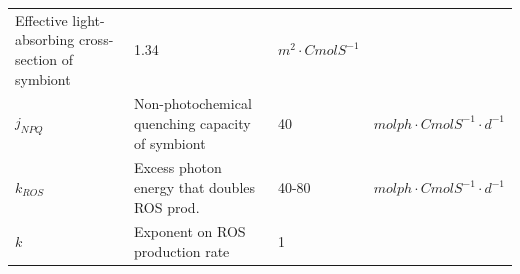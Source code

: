 \documentclass[]{elsarticle} %
\begin{document}
\begin{longtable}[c]{@{}llll@{}}
\begin{minipage}[t]{0.48\columnwidth}\raggedright\strut
Effective light-absorbing cross-section of symbiont
\strut\end{minipage} &
\begin{minipage}[t]{0.09\columnwidth}\raggedright\strut
1.34
\strut\end{minipage} &
\begin{minipage}[t]{0.23\columnwidth}\raggedright\strut
\(m^2 \cdot CmolS^{-1}\)
\strut\end{minipage}\tabularnewline
\begin{minipage}[t]{0.10\columnwidth}\raggedright\strut
\(j_{NPQ}\)
\strut\end{minipage} &
\begin{minipage}[t]{0.48\columnwidth}\raggedright\strut
Non-photochemical quenching capacity of symbiont
\strut\end{minipage} &
\begin{minipage}[t]{0.09\columnwidth}\raggedright\strut
40
\strut\end{minipage} &
\begin{minipage}[t]{0.23\columnwidth}\raggedright\strut
\(mol ph \cdot CmolS^{-1} \cdot d^{-1}\)
\strut\end{minipage}\tabularnewline
\begin{minipage}[t]{0.10\columnwidth}\raggedright\strut
\(k_{ROS}\)
\strut\end{minipage} &
\begin{minipage}[t]{0.48\columnwidth}\raggedright\strut
Excess photon energy that doubles ROS prod.
\strut\end{minipage} &
\begin{minipage}[t]{0.09\columnwidth}\raggedright\strut
40-80
\strut\end{minipage} &
\begin{minipage}[t]{0.23\columnwidth}\raggedright\strut
\(mol ph \cdot CmolS^{-1} \cdot d^{-1}\)
\strut\end{minipage}\tabularnewline
\begin{minipage}[t]{0.10\columnwidth}\raggedright\strut
\(k\)
\strut\end{minipage} &
\begin{minipage}[t]{0.48\columnwidth}\raggedright\strut
Exponent on ROS production rate
\strut\end{minipage} &
\begin{minipage}[t]{0.09\columnwidth}\raggedright\strut
1
\strut\end{minipage} &
\begin{minipage}[t]{0.23\columnwidth}\raggedright\strut

\end{minipage}
\end{longtable}
\end{document}
